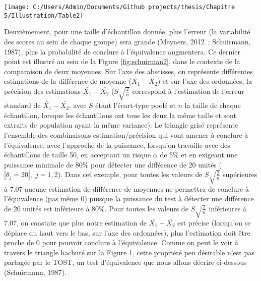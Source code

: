 \documentclass[
  12pt,
  french,
]{article}
\begin{document}
\begin{flushleft}\texttt{[image: C:/Users/Admin/Documents/Github projects/thesis/Chapitre 5/Illustration/Table2]} \end{flushleft}

Deuxièmement, pour une taille d'échantillon donnée, plus l'erreur (la
variabilité des scores au sein de chaque groupe) sera grande (Meyners,
2012~; Schuirmann, 1987), plus la probabilité de conclure à
l'équivalence augmentera. Ce dernier point est illustré au sein de la
Figure \ref{fig:schuirman2}, dans le contexte de la comparaison de deux
moyennes. Sur l'axe des abscisses, on représente différentes estimations
de la différence de moyenne (\(\bar{X_1}-\bar{X_2}\)) et sur l'axe des
ordonnées, la précision des estimations \(\bar{X_1}-\bar{X_2}\)
(\(S\sqrt{\frac{2}{n}}\) correspond à l'estimation de l'erreur standard
de \(\bar{X_1}-\bar{X_2}\), avec \(S\) étant l'écart-type poolé et \(n\)
la taille de chaque échantillon, lorsque les échantillons ont tous les
deux la même taille et sont extraits de population ayant la même
variance).
Le triangle grisé représente l'ensemble des combinaisons
estimation/précision qui vont amener à conclure à l'équivalence, avec
l'approche de la puissance, lorsqu'on travaille avec des échantillons de
taille 50, en acceptant un risque \(\alpha\) de 5\% et en exigeant une
puissance minimale de 80\% pour détecter une différence de 20 unités
(\(|\theta_j=20|,\;j=1,2\)). Dans cet exemple, pour toutes les valeurs
de \(S\sqrt{\frac{2}{n}}\) supérieures à 7.07 aucune estimation de
différence de moyennes ne permettra de conclure à l'équivalence (pas
même 0) puisque la puissance du test à détecter une différence de 20
unités est inférieure à 80\%. Pour toutes les valeurs de
\(S\sqrt{\frac{2}{n}}\) inférieures à 7.07, on constate que plus notre
estimation de \(\bar{X_1}-\bar{X_2}\) est précise (lorsqu'on se déplace
du haut vers le bas, sur l'axe des ordonnées), plus l'estimation doit
être proche de 0 pour pouvoir conclure à l'équivalence. Comme on peut le
voir à travers le triangle hachuré sur la Figure 1, cette propriété peu
désirable n'est pas partagée par le TOST, un test d'équivalence que nous
allons décrire ci-dessous (Schuirmann, 1987).
\end{document}

